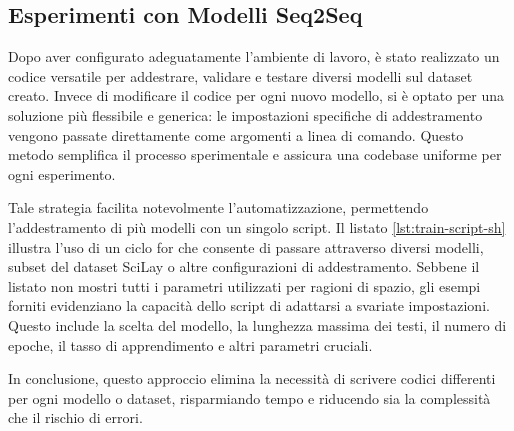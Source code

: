 \documentclass[12pt,a4paper,twoside,openright]{book}
\begin{document}
\subsection{Esperimenti con Modelli Seq2Seq}
Dopo aver configurato adeguatamente l'ambiente di lavoro, è stato realizzato un codice versatile per addestrare, validare e testare diversi modelli sul dataset creato. Invece di modificare il codice per ogni nuovo modello, si è optato per una soluzione più flessibile e generica: le impostazioni specifiche di addestramento vengono passate direttamente come argomenti a linea di comando. Questo metodo semplifica il processo sperimentale e assicura una codebase uniforme per ogni esperimento.

Tale strategia facilita notevolmente l'automatizzazione, permettendo l'addestramento di più modelli con un singolo script. Il listato \ref{lst:train-script-sh} illustra l'uso di un ciclo for che consente di passare attraverso diversi modelli, subset del dataset SciLay o altre configurazioni di addestramento. Sebbene il listato non mostri tutti i parametri utilizzati per ragioni di spazio, gli esempi forniti evidenziano la capacità dello script di adattarsi a svariate impostazioni. Questo include la scelta del modello, la lunghezza massima dei testi, il numero di epoche, il tasso di apprendimento e altri parametri cruciali.

In conclusione, questo approccio elimina la necessità di scrivere codici differenti per ogni modello o dataset, risparmiando tempo e riducendo sia la complessità che il rischio di errori.
\end{document}
